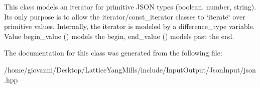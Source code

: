 This class models an iterator for primitive J\+S\+ON types (boolean, number, string). It\textquotesingle{}s only purpose is to allow the iterator/const\+\_\+iterator classes to \char`\"{}iterate\char`\"{} over primitive values. Internally, the iterator is modeled by a {\ttfamily difference\+\_\+type} variable. Value begin\+\_\+value ({}) models the begin, end\+\_\+value ({}) models past the end. 

The documentation for this class was generated from the following file\+:\begin{DoxyCompactItemize}
\item 
/home/giovanni/\+Desktop/\+Lattice\+Yang\+Mills/include/\+Input\+Output/\+Json\+Input/json.\+hpp\end{DoxyCompactItemize}
